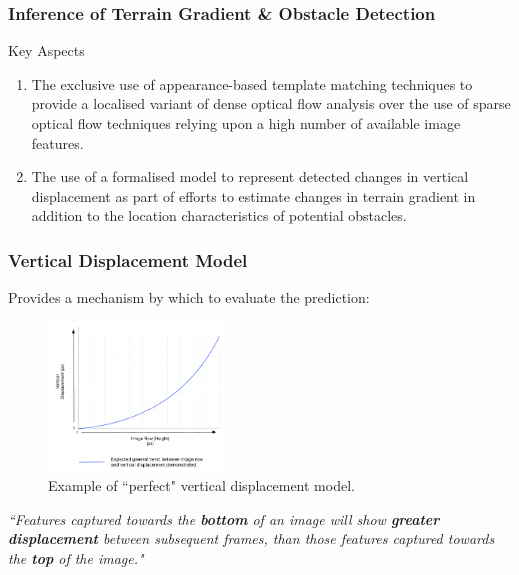 \documentclass[10pt, compress]{beamer}
\begin{document}
\begin{frame}[fragile]
  \frametitle{Inference of Terrain Gradient \& Obstacle Detection}

  \begin{block}{Key Aspects}
   
  \begin{enumerate}[label={\arabic*.}]
  \item The exclusive use of appearance-based template matching techniques to provide a localised variant of dense optical flow analysis over the use of sparse optical flow techniques relying upon a high number of available image features.
  \item The use of a formalised model to represent detected changes in vertical displacement as part of efforts to estimate changes in terrain gradient in addition to the location characteristics of potential obstacles. 
\end{enumerate}
  
 \end{block}
 
\end{frame}

\begin{frame}[fragile]
  \frametitle{Vertical Displacement Model}
  
  \vspace{-20pt}

 Provides a mechanism by which to evaluate the prediction:
 
 \vspace{10pt}
 
       \begin{figure}
   \vspace{-30pt}
  \begin{center}
    \includegraphics[width=0.42\textwidth]{model.pdf}
  \end{center}
  \vspace{-15pt}
  \caption{\small Example of ``perfect" vertical displacement model.}
  \end{figure}
   
   
  \textit{``Features captured towards the \textbf{bottom} of an image will show \textbf{greater displacement} between subsequent frames, than those features captured towards the \textbf{top} of the image."}
   
\end{frame}
\end{document}

